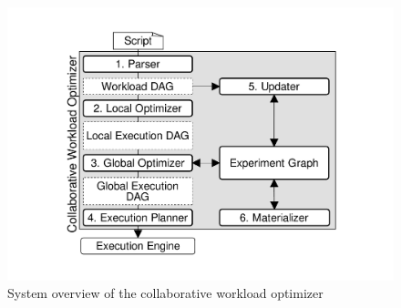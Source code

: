 \begin{figure}
\centering
\includegraphics[width=0.7\columnwidth]{../images/system-workflow}
\caption{System overview of the collaborative workload optimizer}
\label{system-workflow}
\end{figure}


